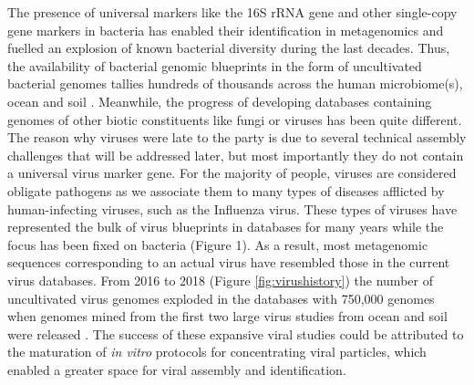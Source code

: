 \noindent
The presence of universal markers like the 16S rRNA gene and other single-copy gene markers in bacteria has enabled their identification in metagenomics and fuelled an explosion of known bacterial diversity during the last decades. Thus, the availability of bacterial genomic blueprints in the form of uncultivated bacterial genomes tallies hundreds of thousands across the human microbiome(s), ocean and soil \cite{Almeida2019-fk}. Meanwhile, the progress of developing databases containing genomes of other biotic constituents like fungi or viruses has been quite different. The reason why viruses were late to the party is due to several technical assembly challenges that will be addressed later, but most importantly they do not contain a universal virus marker gene. For the majority of people, viruses are considered obligate pathogens as we associate them to many types of diseases afflicted by human-infecting viruses, such as the Influenza virus. These types of viruses have represented the bulk of virus blueprints in databases for many years while the focus has been fixed on bacteria (Figure 1). As a result, most metagenomic sequences corresponding to an actual virus have resembled those in the current virus databases. From 2016 to 2018 (Figure \ref{fig:virushistory}) the number of uncultivated virus genomes exploded in the databases with 750,000 genomes when genomes mined from the first two large virus studies from ocean and soil were released \cite{Roux2016-yu,Paez-Espino2016-bb}. The success of these expansive viral studies could be attributed to the maturation of \textit{in vitro} protocols for concentrating viral particles, which enabled a greater space for viral assembly and identification.

